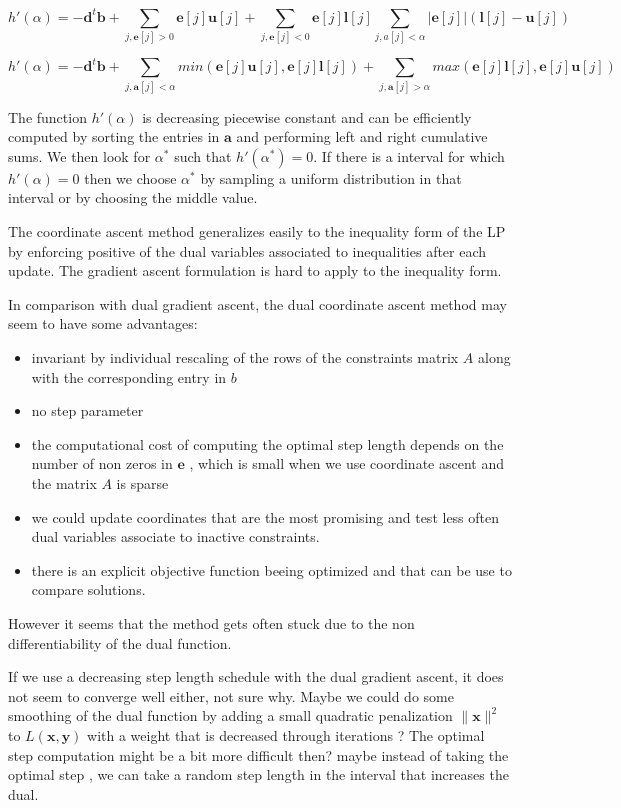 \documentclass[11pt]{article}
\begin{document}
\begin{equation}
h'(\alpha)=-\mathbf{d}^t\mathbf{b}+ \sum_{j,\mathbf{e}[j]>0} \mathbf{e}[j] \mathbf{u}[j]+\sum_{j,\mathbf{e}[j]<0} \mathbf{e}[j]  \mathbf{l}[j]\sum_{j,a[j]<\alpha}|\mathbf{e}[j]|(\mathbf{l}[j]-\mathbf{u}[j])
\end{equation}

\begin{equation}
h'(\alpha)=-\mathbf{d}^t\mathbf{b}+ \sum_{j,\mathbf{a}[j]<\alpha}min(\mathbf{e}[j]\mathbf{u}[j],\mathbf{e}[j]\mathbf{l}[j])+
\sum_{j,\mathbf{a}[j]>\alpha}max(\mathbf{e}[j]\mathbf{l}[j],\mathbf{e}[j]\mathbf{u}[j])
\end{equation}

The function $h'(\alpha)$ is decreasing piecewise constant and can be efficiently computed by sorting the entries in $\mathbf{a}$ and performing left and right cumulative sums.
We then look for $\alpha^*$ such that $h'(\alpha^*)=0$. If there is a interval for which $h'(\alpha)=0$ then we choose $\alpha^*$ by sampling a uniform distribution in that interval or by choosing the middle value.


The coordinate ascent method generalizes easily to the inequality form of the LP by enforcing positive of the dual variables associated to inequalities after each update.
The gradient ascent formulation is hard to apply to the inequality form.

In comparison with dual gradient ascent, the dual coordinate ascent method may seem to have some advantages:
\begin{itemize}
\item invariant by individual rescaling of the rows of the constraints matrix $A$ along with the corresponding entry in $b$
\item no step parameter
\item the computational cost of computing the optimal step length depends on the number of non zeros in $\mathbf{e}$ , which  is small when we use coordinate ascent and the matrix $A$ is sparse
\item we could update coordinates that are the most promising and test less often dual variables associate to inactive  constraints.
\item there is an explicit objective function beeing optimized and that can be use to compare solutions.
\end{itemize}
However it seems that the method  gets often stuck due to the non differentiability of the dual function.


If we use a decreasing step length  schedule with the dual gradient ascent, it does not seem to converge well either, not sure why.
Maybe we could do some smoothing of the dual function by adding a small quadratic penalization $\|{\mathbf{x}}\|^2$ to $L(\mathbf{x},\mathbf{y})$ with a weight that is decreased through iterations ?
The optimal step computation might be a bit more difficult then? 
maybe instead of taking the optimal step , we can take a random step length in the interval that increases the dual.
\end{document}

